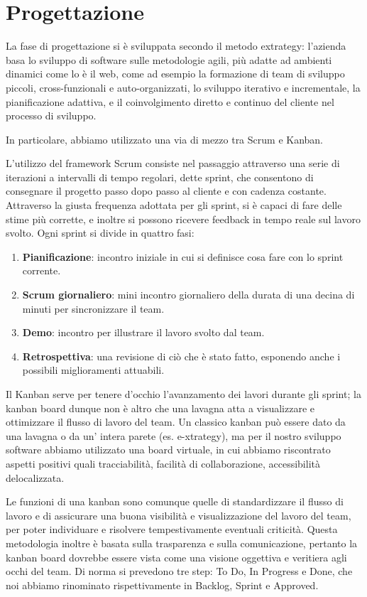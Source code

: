 \section{Progettazione}
La fase di progettazione si è sviluppata secondo il metodo extrategy: l'azienda basa lo sviluppo di software sulle metodologie agili, più adatte ad ambienti dinamici come lo è il web, come ad esempio la formazione di team di sviluppo piccoli, cross-funzionali e auto-organizzati, 
lo sviluppo iterativo e incrementale, la pianificazione adattiva, e il coinvolgimento diretto e continuo del cliente nel processo di sviluppo.

In particolare, abbiamo utilizzato una via di mezzo tra Scrum e Kanban.

L'utilizzo del framework Scrum\cite{scrum} consiste nel passaggio attraverso una serie di iterazioni a intervalli di tempo regolari, dette sprint, che consentono di consegnare il progetto passo dopo passo al cliente e con cadenza costante. Attraverso la giusta frequenza adottata per gli sprint, si è capaci di fare delle stime più corrette, e inoltre si possono ricevere feedback in tempo reale sul lavoro svolto.
Ogni sprint si divide in quattro fasi:
\begin{enumerate}
	\item \textbf{Pianificazione}: incontro iniziale in cui si definisce cosa fare con lo sprint corrente.
	\item \textbf{Scrum giornaliero}: mini incontro giornaliero della durata di una decina di minuti per sincronizzare il team. 
	\item \textbf{Demo}: incontro per illustrare il lavoro svolto dal team.
	\item \textbf{Retrospettiva}: una revisione di ciò che è stato fatto, esponendo anche i possibili miglioramenti attuabili.
\end{enumerate} 

Il Kanban\cite{kanban} serve per tenere d'occhio l'avanzamento dei lavori durante gli sprint; la kanban board dunque non è altro che una lavagna atta a visualizzare e ottimizzare il flusso di lavoro del team. Un classico kanban può essere dato da una lavagna o da un' intera parete (es. e-xtrategy), ma per il nostro sviluppo software abbiamo utilizzato una board virtuale, in cui abbiamo riscontrato aspetti positivi quali tracciabilità, facilità di collaborazione, accessibilità delocalizzata.

Le funzioni di una kanban sono comunque quelle di standardizzare il flusso di lavoro e di assicurare una buona visibilità e visualizzazione del lavoro del team, per poter individuare e risolvere tempestivamente eventuali criticità.
Questa metodologia inoltre è basata sulla trasparenza e sulla comunicazione, pertanto la kanban board dovrebbe essere vista come una visione oggettiva e veritiera agli occhi del team.
Di norma si prevedono tre step: To Do, In Progress e Done, che noi abbiamo rinominato rispettivamente in Backlog, Sprint e Approved.

